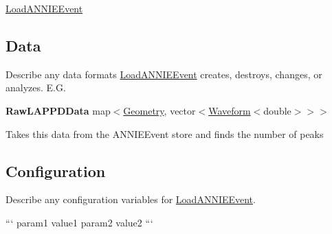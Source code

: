 \hyperlink{classLoadANNIEEvent}{Load\-A\-N\-N\-I\-E\-Event}

\subsection*{Data}

Describe any data formats \hyperlink{classLoadANNIEEvent}{Load\-A\-N\-N\-I\-E\-Event} creates, destroys, changes, or analyzes. E.\-G.

{\bfseries Raw\-L\-A\-P\-P\-D\-Data} {\ttfamily map$<$\hyperlink{classGeometry}{Geometry}, vector$<$\hyperlink{classWaveform}{Waveform}$<$double$>$$>$$>$}
\begin{DoxyItemize}
\item Takes this data from the {\ttfamily A\-N\-N\-I\-E\-Event} store and finds the number of peaks
\end{DoxyItemize}

\subsection*{Configuration}

Describe any configuration variables for \hyperlink{classLoadANNIEEvent}{Load\-A\-N\-N\-I\-E\-Event}.

``` param1 value1 param2 value2 ``` 